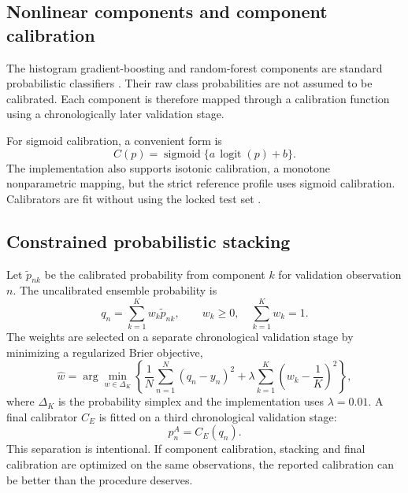\documentclass[11pt]{article}
\newcommand{\sigmoid}{\operatorname{sigmoid}}
\newcommand{\logit}{\operatorname{logit}}
\begin{document}
\subsection{Nonlinear components and component calibration}

The histogram gradient-boosting and random-forest components are standard probabilistic classifiers \citep{friedman2001greedy,breiman2001random}. Their raw class probabilities are not assumed to be calibrated. Each component is therefore mapped through a calibration function using a chronologically later validation stage.

For sigmoid calibration, a convenient form is
\begin{equation}
C(p)=\sigmoid\{a\,\logit(p)+b\}.
\label{eq:sigcal}
\end{equation}
The implementation also supports isotonic calibration, a monotone nonparametric mapping, but the strict reference profile uses sigmoid calibration. Calibrators are fit without using the locked test set \citep{niculescu2005predicting,gneiting2007calibration}.

\subsection{Constrained probabilistic stacking}

Let $\tilde p_{nk}$ be the calibrated probability from component $k$ for validation observation $n$. The uncalibrated ensemble probability is
\begin{equation}
q_n=\sum_{k=1}^{K}w_k\tilde p_{nk},
\qquad
w_k\ge0,\quad\sum_{k=1}^{K}w_k=1.
\label{eq:stack}
\end{equation}
The weights are selected on a separate chronological validation stage by minimizing a regularized Brier objective,
\begin{equation}
\hat w
=\arg\min_{w\in\Delta_K}
\left\{
\frac{1}{N}\sum_{n=1}^{N}(q_n-y_n)^2
+\lambda\sum_{k=1}^{K}\left(w_k-\frac1K\right)^2
\right\},
\label{eq:stackopt}
\end{equation}
where $\Delta_K$ is the probability simplex and the implementation uses $\lambda=0.01$. A final calibrator $C_E$ is fitted on a third chronological validation stage:
\begin{equation}
p_n^A=C_E(q_n).
\label{eq:anchorprob}
\end{equation}
This separation is intentional. If component calibration, stacking and final calibration are optimized on the same observations, the reported calibration can be better than the procedure deserves.
\end{document}
